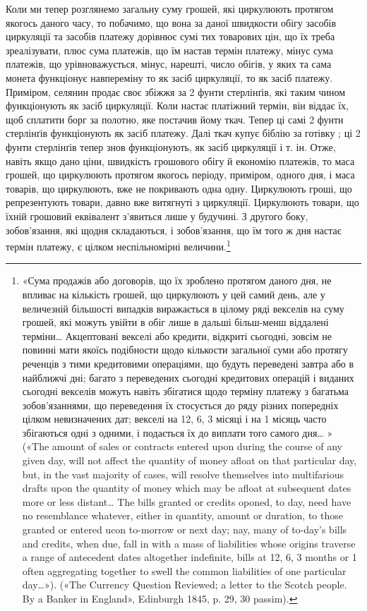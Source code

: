 Коли ми тепер розглянемо загальну суму грошей, які циркулюють протягом якогось даного часу, то
побачимо, що вона за даної швидкости обігу засобів циркуляції та засобів платежу дорівнює сумі тих
товарових цін, що їх треба зреалізувати, плюс сума платежів, що їм настав термін платежу, мінус сума
платежів, що урівноважується, мінус, нарешті, число обігів, у яких та сама монета функціонує
навпереміну то як засіб циркуляції, то як засіб платежу. Приміром, селянин продає своє збіжжя за 2
фунти стерлінґів, які таким чином функціонують як засіб циркуляції. Коли настає платіжний термін,
він віддає їх, щоб сплатити борг за полотно, яке постачив йому ткач. Тепер ці самі 2 фунти
стерлінґів функціонують як засіб платежу. Далі ткач купує біблію за готівку ; ці 2 фунти стерлінґів
тепер знов функціонують,
як засіб циркуляції і т. ін. Отже, навіть якщо дано ціни, швидкість грошового обігу й
економію платежів, то маса грошей, що циркулюють протягом якогось періоду, приміром, одного дня, і
маса товарів, що циркулюють, вже не покривають одна одну. Циркулюють гроші, що репрезентують товари,
давно вже витягнуті з циркуляції. Циркулюють товари, що їхній грошовий еквівалент з’явиться лише у
будучині. З другого боку, зобов’язання, які щодня складаються, і зобов’язання, що їм того ж дня
настає термін платежу, є цілком неспільномірні величини.\footnote{
«Сума продажів або договорів, що їх зроблено протягом даного дня, не впливає на кількість
грошей, що циркулюють у цей самий день, але у величезній більшості випадків виражається в цілому
ряді векселів на суму грошей, які можуть увійти в обіг лише в дальші більш-менш віддалені терміни\dots{}
Акцептовані векселі або кредити, відкриті сьогодні, зовсім не повинні мати якоїсь подібности щодо
кількости загальної суми або протягу реченців з тими кредитовими операціями, що будуть переведені
завтра або в найближчі дні; багато з переведених сьогодні кредитових операцій і виданих сьогодні
векселів можуть навіть збігатися щодо терміну платежу з багатьма зобов’язаннями, що переведення їх
стосується до ряду різних попередніх цілком невизначених дат; векселі на 12, 6, 3 місяці і на 1
місяць часто збігаються одні з одними, і подається їх до виплати того самого дня\dots{} » («The amount
of sales or contracts entered upon during the course of any given day, will not affect the quantity
of money afloat on that particular day, but, in the vast majority of cases, will resolve themselves
into multifarious drafts upon the quantity of money which may be afloat at subsequent dates more or
less distant\dots{} The bills granted or credits oponed, to day, need have no resemblance whatever,
either in quantity, amount or duration, to those granted or entered ucon to-morrow or next day; nay,
many of to-day’s bills and credits, when due, fall in with a mass of liabilities whose origins
traverse a range of antecedent dates altogether indefinite, bills at 12, 6, 3 months or 1 often
aggregating together to swell the common liabilities of one particular day\dots{}»). («The Currency
Question Reviewed; a letter to the Scotch people. By a Banker in England», Edinburgh 1845, p. 29, 30
passim).
}

